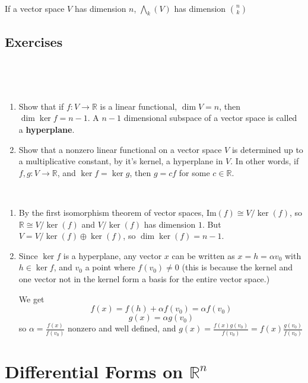 \documentclass{article}
\begin{document}
\begin{corollary}
  \

  If a vector space $V$ has dimension $n$, $\bigwedge_k(V)$ has dimension $\binom{n}{k}$
\end{corollary}

\subsection{Exercises}
\

\begin{exercise}[3.2]
  \

  \begin{enumerate}
    \item Show that if $f: V \to \mathbb{R}$ is a linear functional, $\dim V = n$, then $\dim \ker f = n-1$. A $n-1$ dimensional subspace of a vector space is called a \textbf{hyperplane}.
    \item Show that a nonzero linear functional on a vector space $V$ is determined up to a multiplicative constant, by it's kernel, a hyperplane in $V$. In other words, if $f, g: V \to \mathbb{R}$, and $\ker f = \ker g$, then $g = cf$ for some $c \in \mathbb{R}$.
  \end{enumerate}
\end{exercise}

\begin{customproof}
  \

  \begin{enumerate}
    \item By the first isomorphism theorem of vector spaces, $\text{Im}(f) \cong V/\ker(f)$, so $\mathbb{R} \cong V/\ker(f)$ and $V/\ker(f)$ has dimension $1$. But $V = V/\ker(f) \oplus \ker(f)$, so $\dim \ker(f) = n-1$.
    \item Since $\ker f$ is a hyperplane, any vector $x$ can be written as $x = h = \alpha v_0$ with $h \in \ker f$, and $v_0$ a point where $f(v_0) \neq 0$ (this is because the kernel and one vector not in the kernel form a basis for the entire vector space.)

      We get $$f(x) = f(h) + \alpha f(v_0) = \alpha f(v_0)$$$$g(x) =  \alpha g(v_0)$$so $\alpha = \frac{f(x)}{f(v_0)}$ nonzero and well defined, and $g(x) = \frac{f(x)g(v_0)}{f(v_0)} = f(x)\frac{g(v_0)}{f(v_0)}$
  \end{enumerate}
\end{customproof}

\section{Differential Forms on $\mathbb{R}^n$}
\end{document}
